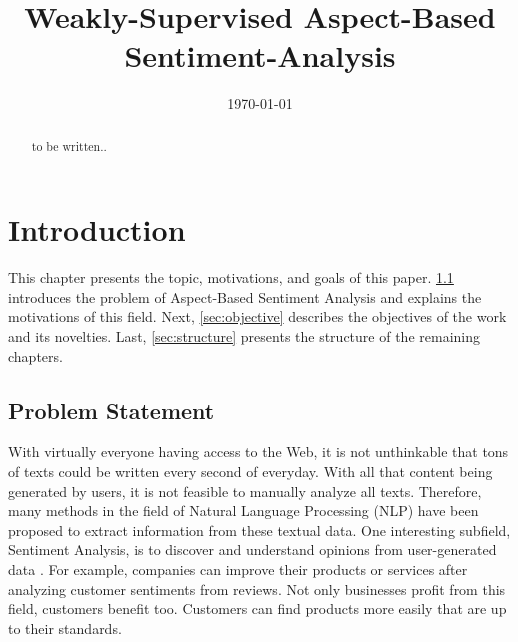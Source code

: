 \documentclass[american, oneside]{ecsgdp}
\begin{document}
\newcommand{\modelname}{MODELNAME }

\frontmatter
\title{Weakly-Supervised Aspect-Based Sentiment-Analysis}
\addresses{\groupname\\\deptname\\\univname}
\date{\today}

% 

\maketitle

\begin{abstract}
    to be written..
\end{abstract}

\tableofcontents

\mainmatter
\chapter{Introduction} \label{chap:introduction}
This chapter presents the topic, motivations, and goals of this paper. \cref{sec:problem} introduces the problem of Aspect-Based Sentiment Analysis and explains the motivations of this field. Next, \cref{sec:objective} describes the objectives of the work and its novelties. Last, \cref{sec:structure} presents the structure of the remaining chapters. %

\section{Problem Statement} \label{sec:problem}
With virtually everyone having access to the Web, it is not unthinkable that tons of texts could be written every second of everyday. With all that content being generated by users, it is not feasible to manually analyze all texts. Therefore, many methods in the field of Natural Language Processing (NLP) have been proposed to extract information from these textual data. One interesting subfield, Sentiment Analysis, is to discover and understand opinions from user-generated data \parencite{Liu2012SAOP}. For example, companies can improve their products or services after analyzing customer sentiments from reviews. Not only businesses profit from this field, customers benefit too. Customers can find products more easily that are up to their standards.
\end{document}
